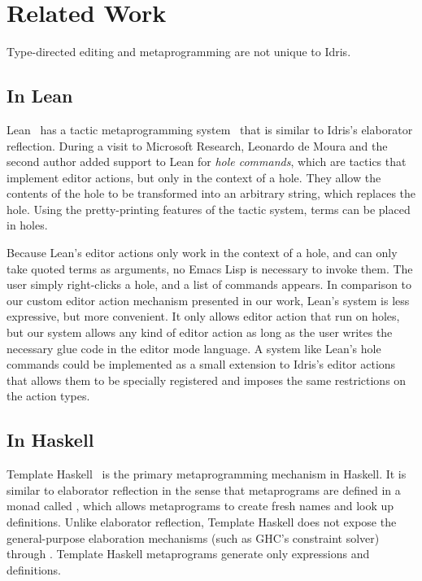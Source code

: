 \section{Related Work} \label{sec:relatedwork}

Type-directed editing and metaprogramming are not unique to Idris.


\subsection{In Lean}


Lean~\cite{lean} has a tactic metaprogramming system~\cite{leanmeta}
that is similar to Idris's elaborator reflection.  During a visit to
Microsoft Research, Leonardo de Moura and the second author added
support to Lean for \emph{hole commands}, which are tactics that implement
editor actions, but only in the context of a hole. They allow the
contents of the hole to be transformed into an arbitrary string, which
replaces the hole. Using the pretty-printing features of the tactic
system, terms can be placed in holes.

Because Lean's editor actions only work in the context of a hole, and
can only take quoted terms as arguments, no Emacs Lisp is necessary to
invoke them. The user simply right-clicks a hole, and a list of
commands appears.  In comparison to our custom editor action mechanism
presented in our work, Lean's system is less expressive, but more
convenient.  It only allows editor action that run on holes, but our
system allows any kind of editor action as long as the user writes the
necessary glue code in the editor mode language.
A system like Lean's hole commands could be implemented as a small
extension to Idris's editor actions that allows them to be specially
registered and imposes the same restrictions on the action types.

\subsection{In Haskell}

Template Haskell~\cite{th} is the primary metaprogramming mechanism in
Haskell.  It is similar to elaborator reflection in the sense that
metaprograms are defined in a monad called , which allows
metaprograms to create fresh names and look up definitions.  Unlike
elaborator reflection, Template Haskell does not expose the
general-purpose elaboration mechanisms (such as GHC's constraint
solver) through .  Template Haskell metaprograms generate only
expressions and definitions.

